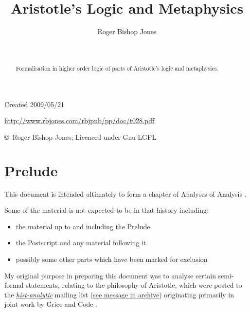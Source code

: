 \documentclass[11pt]{article}
\title{Aristotle's Logic and Metaphysics}
\author{Roger Bishop Jones}
\date{\ }
\begin{document}
\begin{titlepage}
\maketitle
\begin{abstract}
Formalisation in higher order logic of parts of Aristotle's logic and metaphysics.
\end{abstract}
\vfill

\begin{centering}
{\footnotesize

Created 2009/05/21



\href{http://www.rbjones.com/rbjpub/pp/doc/t028.pdf}
{http://www.rbjones.com/rbjpub/pp/doc/t028.pdf}

\copyright\ Roger Bishop Jones; Licenced under Gnu LGPL

}%
\end{centering}

\thispagestyle{empty}
\end{titlepage}

\newpage
\addtocounter{page}{1}
{\parskip=0pt\tableofcontents}

\section{Prelude}

This document is intended ultimately to form a chapter of Analyses of Analysis \cite{rbjb001}.

Some of the material is not expected to be in that history including:
\begin{itemize}
\item the material up to and including the Prelude
\item the Postscript and any material following it.
\item possibly some other parts which have been marked for exclusion
\end{itemize}

My original purpose in preparing this document was to analyse certain semi-formal statements, relating to the philosophy of Aristotle, which were posted to the \href{http://hist-analytic.org}{\it hist-analytic} mailing list (\href{http://rbjones.com/pipermail/hist-analytic_rbjones.com/2009q2/000258.html}{see message in archive}) originating primarily in joint work by Grice \cite{grice88} and Code \cite{code88}.
\end{document}

